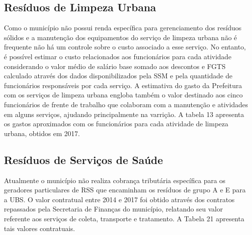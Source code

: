 	\subsection{Resíduos de Limpeza Urbana}
	Como o município não possui renda específica para gerenciamento dos resíduos sólidos e a manutenção dos equipamentos do serviço de limpeza urbana não é frequente não há um controle sobre o custo associado a esse serviço. No entanto, é possível estimar o custo relacionados aos funcionários para cada atividade considerando o valor médio de salário base somado aos descontos e FGTS calculado através dos dados disponibilizados pela SSM e pela quantidade de funcionários responsáveis por cada serviço. A estimativa do gasto da Prefeitura com os serviços de limpeza urbana engloba também o valor destinado aos cinco funcionários de frente de trabalho que colaboram com a manutenção e atividades em alguns serviços, ajudando principalmente na varrição.  A tabela 13 apresenta os gastos aproximados com os funcionários para cada atividade de limpeza urbana, obtidos em 2017.
	
	
	
	\subsection{Resíduos de Serviços de Saúde}
	Atualmente o município não realiza cobrança tributária específica para os geradores particulares de RSS que encaminham os resíduos de grupo A e E para a UBS.
	O valor contratual entre 2014 e 2017 foi obtido através dos contratos repassados pela Secretaria de Finanças do município, relatando seu valor referente aos serviços de coleta, transporte e tratamento. A Tabela 21 apresenta tais valores contratuais.
	
	